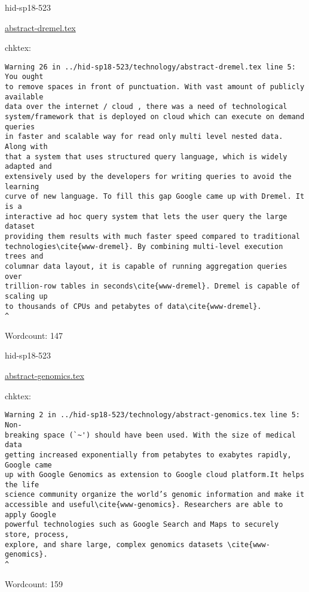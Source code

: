 \begin{IU}

hid-sp18-523

\href{https://github.com/cloudmesh-community/hid-sp18-523/blob/master//technology/abstract-dremel.tex}{abstract-dremel.tex}

 
chktex:
\begin{tiny}
\begin{verbatim}
Warning 26 in ../hid-sp18-523/technology/abstract-dremel.tex line 5: You ought
to remove spaces in front of punctuation. With vast amount of publicly available
data over the internet / cloud , there was a need of technological
system/framework that is deployed on cloud which can execute on demand queries
in faster and scalable way for read only multi level nested data. Along with
that a system that uses structured query language, which is widely adapted and
extensively used by the developers for writing queries to avoid the learning
curve of new language. To fill this gap Google came up with Dremel. It is a
interactive ad hoc query system that lets the user query the large dataset
providing them results with much faster speed compared to traditional
technologies\cite{www-dremel}. By combining multi-level execution trees and
columnar data layout, it is capable of running aggregation queries over
trillion-row tables in seconds\cite{www-dremel}. Dremel is capable of scaling up
to thousands of CPUs and petabytes of data\cite{www-dremel}.
^
\end{verbatim}
\end{tiny}

Wordcount: 147

\end{IU}



\begin{IU}

hid-sp18-523

\href{https://github.com/cloudmesh-community/hid-sp18-523/blob/master//technology/abstract-genomics.tex}{abstract-genomics.tex}

 
chktex:
\begin{tiny}
\begin{verbatim}
Warning 2 in ../hid-sp18-523/technology/abstract-genomics.tex line 5: Non-
breaking space (`~') should have been used. With the size of medical data
getting increased exponentially from petabytes to exabytes rapidly, Google came
up with Google Genomics as extension to Google cloud platform.It helps the life
science community organize the world’s genomic information and make it
accessible and useful\cite{www-genomics}. Researchers are able to apply Google
powerful technologies such as Google Search and Maps to securely store, process,
explore, and share large, complex genomics datasets \cite{www-genomics}.
^
\end{verbatim}
\end{tiny}

Wordcount: 159

\end{IU}

